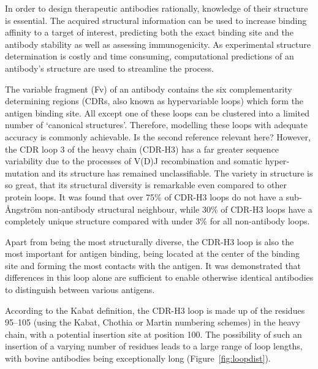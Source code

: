 \documentclass[12pt]{article}
\newcommand{\lilian}[1]{ {\color{red}{\bfseries Lilian:} #1}}
\begin{document}
In order to design therapeutic antibodies rationally, knowledge of
their structure is essential. The acquired structural information can
be used to increase binding affinity to a target of interest,
predicting both the exact binding site and the antibody stability as
well as assessing immunogenicity\cite{Abhinandan2007}. As
experimental structure determination is costly and time
consuming, computational predictions of an antibody's structure are
used to streamline the process.

The variable
fragment (Fv) of an antibody contains the six complementarity determining regions
(CDRs, also known as hypervariable loops) which form the antigen binding site.
All except one of these loops can be clustered
into a limited number of `canonical structures'\cite{XXXX}. Therefore, modelling
these loops with adequate accuracy is commonly
achievable\cite{North2011,Weitzner2015}. \lilian{Is the second reference relevant here?} However, the CDR loop 3 of the 
heavy chain (CDR-H3) has a far greater sequence variability due to the
processes of V(D)J recombination and somatic hyper‐mutation and its
structure has remained unclassifiable\cite{Finn2016}. The variety in
structure is so great, that its structural diversity is remarkable
even compared to other protein loops\cite{Regep2017}. It was found
that over 75\% of CDR-H3 loops do not have a sub-{\AA}ngstr\"{o}m non-antibody
structural neighbour, while 30\% of CDR-H3 loops have a
completely unique structure compared with under 3\% for all non-antibody
loops\cite{Regep2017}.

Apart from being the most structurally diverse, the CDR-H3 loop is
also the most important for antigen binding, being located at the
center of the binding site and forming the most contacts with the
antigen\cite{MacCallum1996}. It was demonstrated that
differences in this loop alone are sufficient to enable otherwise
identical antibodies to distinguish between various
antigens\cite{Xu2000}.

According to the Kabat definition, the CDR-H3 loop is made up of the
residues 95--105 (using the Kabat\cite{Kabat1992}, Chothia\cite{XXXX} or Martin\cite{XXXX} numbering schemes) in the heavy
chain, with a potential insertion site at position 100. The
possibility of such an insertion of a varying number of residues leads
to a large range of loop lengths, with bovine antibodies being
exceptionally long (Figure~\ref{fig:loopdist}).
\end{document}
